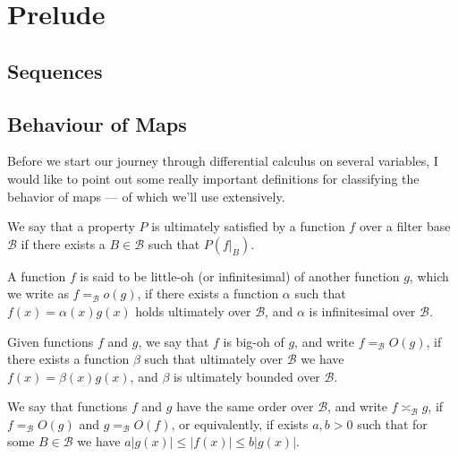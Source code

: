 \section{Prelude}

\subsection{Sequences}


\subsection{Behaviour of Maps}

Before we start our journey through differential calculus on several variables,
I would like to point out some really important definitions for classifying the
behavior of maps --- of which we'll use extensively.

\begin{definition}[Ultimately]
We say that a property \(P\) is ultimately satisfied by a function \(f\) over
a filter base \(\mathcal B\) if there exists a \(B \in \mathcal B\) such that
\(P(f|_B)\).
\end{definition}

\begin{definition}[Little-oh]\label{def: little oh}
A function \(f\) is said to be little-oh (or infinitesimal) of another
function \(g\), which we write as \(f =_{\mathcal B} o(g)\), if there exists
a function \(\alpha\) such that \(f(x) = \alpha(x) g(x)\) holds ultimately
over \(\mathcal B\), and \(\alpha\) is infinitesimal over \(\mathcal B\).
\end{definition}

\begin{definition}[Big-oh]\label{def: big oh}
Given functions \(f\) and \(g\), we say that \(f\) is big-oh of \(g\), and
write \(f =_{\mathcal B} O(g)\), if there exists a function \(\beta\) such
that ultimately over \(\mathcal B\) we have \(f(x) = \beta(x) g(x)\), and
\(\beta\) is ultimately bounded over \(\mathcal B\).
\end{definition}

\begin{definition}\label{def: asymp-order}
We say that functions \(f\) and \(g\) have the same order over \(\mathcal
B\), and write \(f \asymp_{\mathcal B} g\), if \(f =_{\mathcal B} O(g)\) and
\(g =_{\mathcal B} O(f)\), or equivalently, if exists \(a, b > 0\) such that
for some \(B \in \mathcal B\) we have \(a |g(x)| \leq |f(x)| \leq b|g(x)|\).
\end{definition}

